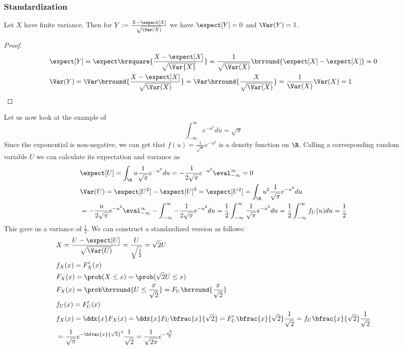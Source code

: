 \subsubsection{Standardization}
Let $X$ have finite variance. Then for $Y:=\frac{X-\expect[X]}{\sqrt{\Var(X)}}$ we have $\expect[Y]=0$ and $\Var(Y)=1$.
\begin{proof}
\begin{align*}
    &\expect[Y]=\expect\brsquare{\frac{X-\expect[X]}{\sqrt{\Var{X}}}}=\frac{1}{\sqrt{\Var(X)}}\brround{\expect[X]-\expect[X]}=0\\
    &\Var(Y)=\Var\brround{\frac{X-\expect[X]}{\sqrt{\Var(X)}}}=\Var\brround{\frac{X}{\sqrt{\Var(X)}}}=\frac{1}{\Var(X)}\Var(X)=1
\end{align*}
\end{proof}
Let us now look at the example of
\[\int_{-\infty}^\infty e^{-u^2}du=\sqrt{\pi}\]
Since the exponential is non-negative, we can get that $f(u)=\frac{1}{\sqrt{\pi}}e^{-u^2}$ is a density function on $\R$. Calling a corresponding random variable $U$ we can calculate its expectation and variance as
\begin{align*}
    &\expect[U]=\int_\R u\frac{1}{\sqrt{\pi}}e^{-u^2}du=-\frac{1}{2\sqrt{\pi}}e^{-u^2}\eval_{-\infty}^\infty=0\\
    &\Var(U)=\expect[U^2]-\expect[U]^2=\expect[U^2]=\int_\R u^2\frac{1}{\sqrt{\pi}}e^{-u^2}du\\
    &=-\frac{u}{2\sqrt{\pi}}e^{-u^2}\eval_{-\infty}^\infty-\int_{-\infty}^\infty -\frac{1}{2\sqrt{\pi}}e^{-u^2}du=\frac{1}{2}\int_{-\infty}^\infty\frac{1}{\sqrt{\pi}}e^{-u^2}du=\frac{1}{2}\int_{-\infty}^\infty f_U(u)du=\frac{1}{2}
\end{align*}
This gave us a variance of $\frac{1}{2}$. We can construct a standardized version as follows:
\begin{align*}
    &X=\frac{U-\expect[U]}{\sqrt{\Var(U)}}=\frac{U}{\sqrt{\frac{1}{2}}}=\sqrt{2}U\\
    &f_X(x)=F_X'(x)\\
    &F_X(x)=\prob(X\leq x)=\prob(\sqrt{2}U\leq x)\\
    &F_X(x)=\prob\brround{U\leq\frac{x}{\sqrt{2}}}=F_U\brround{\frac{x}{\sqrt{2}}}\\
    &f_U(x)=F_U'(x)\\
    &f_X(x)=\ddx{x}F_X(x)=\ddx{x}F_U\bfrac{x}{\sqrt{2}}=F_U'\bfrac{x}{\sqrt{2}}\frac{1}{\sqrt{2}}=f_U\bfrac{x}{\sqrt{2}}\frac{1}{\sqrt{2}}\\
    &=\frac{1}{\sqrt{\pi}}e^{-\bfrac{x}{\sqrt{2}}^2}\frac{1}{\sqrt{2}}=\frac{1}{\sqrt{2\pi}}e^{-\frac{x^2}{2}}
\end{align*}
